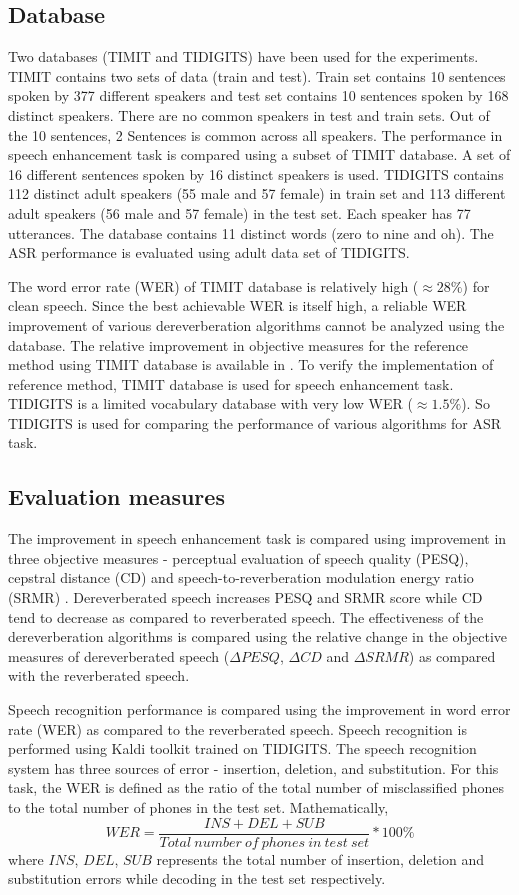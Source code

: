 \subsection{Database}
Two databases (TIMIT and TIDIGITS) have been used for the experiments. TIMIT contains two sets of data (train and test). Train set contains 10 sentences spoken by 377 different speakers and test set contains 10 sentences spoken by 168 distinct speakers. There are no common speakers in test and train sets. Out of the 10 sentences, 2 Sentences is common across all speakers. The performance in speech enhancement task is compared using a subset of TIMIT database. A set of 16 different sentences spoken by 16 distinct speakers is used. TIDIGITS contains 112 distinct adult speakers (55 male and 57 female) in train set and 113 different adult speakers (56 male and 57 female) in the test set. Each speaker has 77 utterances.  The database contains 11 distinct words (zero to nine and oh). The ASR performance is evaluated using adult data set of TIDIGITS. 

The word error rate (WER) of TIMIT database is relatively high ($\approx28\%$) for clean speech. Since the best achievable WER is itself high, a reliable WER improvement of various dereverberation algorithms cannot be analyzed using the database. The relative improvement in objective measures for the reference method using TIMIT database is available in \cite{mohammadiha2016speech}. To verify the implementation of reference method, TIMIT database is used for speech enhancement task. TIDIGITS is a limited vocabulary database with very low WER ($\approx1.5\%$). So TIDIGITS is used for comparing the performance of various algorithms for ASR task.   
\subsection{Evaluation measures}
The improvement in speech enhancement task is compared using improvement in three objective measures - perceptual evaluation of speech quality (PESQ), cepstral distance (CD) and speech-to-reverberation modulation energy ratio  (SRMR) \cite{falk2010non} \cite{reverb2014}. Dereverberated speech increases PESQ and SRMR score while CD tend to decrease as compared to reverberated speech. The effectiveness of the dereverberation algorithms is compared using the relative change in the objective measures of dereverberated speech ($\Delta PESQ$, $\Delta CD$ and $\Delta SRMR$) as compared with the reverberated speech.

Speech recognition performance is compared using the improvement in word error rate (WER) as compared to the reverberated speech. Speech recognition is performed using Kaldi toolkit trained on TIDIGITS. The speech recognition system has three sources of error - insertion, deletion, and substitution. For this task, the WER is defined as the ratio of the total number of misclassified phones to the total number of phones in the test set. Mathematically,
\begin{equation}
WER = \dfrac{INS + DEL + SUB}{Total\ number\ of\ phones\ in\ test\ set}*100\%
\end{equation}
where $INS$, $DEL$, $SUB$ represents the total number of insertion, deletion and substitution errors while decoding in the test set respectively. 
